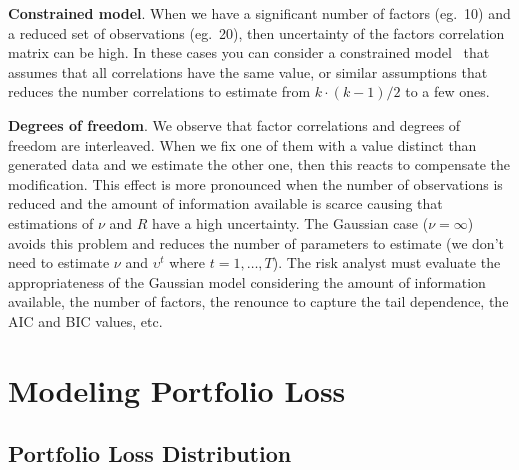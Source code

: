 \documentclass[11pt,fleqn]{book} %
\begin{document}
\textbf{Constrained model}. When we have a significant number of factors 
(eg.\ 10) and a reduced set of observations (eg.\ 20), then uncertainty of 
the factors correlation matrix can be high. In these cases you can consider 
a constrained model~\cite{roncalli:2004} that assumes that all correlations 
have the same value, or similar assumptions that reduces the number 
correlations to estimate from $k \cdot(k-1)/2$ to a few ones.

\textbf{Degrees of freedom}. We observe that factor correlations and degrees 
of freedom are interleaved. When we fix one of them with a value distinct 
than generated data and we estimate the other one, then this reacts to 
compensate the modification. This effect is more pronounced when the number 
of observations is reduced and the amount of 
information available is scarce causing that estimations of $\nu$ and $R$
have a high uncertainty. The Gaussian case ($\nu = \infty$) avoids this 
problem and reduces the number of parameters to estimate (we don't need to 
estimate $\nu$ and $\upsilon^t$ where $t=1,\dots,T$). 
The risk analyst must evaluate the appropriateness of the Gaussian model 
considering the amount of information available, the number of factors, 
the renounce to capture the tail dependence, the AIC and BIC values, etc.


\chapter{Modeling Portfolio Loss}

\section{Portfolio Loss Distribution}
\end{document}
